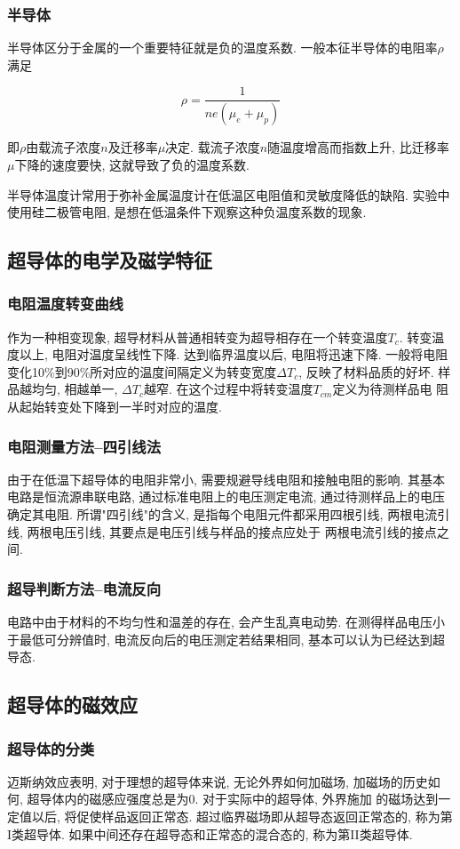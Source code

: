 \documentclass[12pt,a4paper]{article}
\newcommand{\be}[1]{
    \begin{equation}
        #1
    \end{equation}
}
\begin{document}
\subsubsection{半导体}
半导体区分于金属的一个重要特征就是负的温度系数. 一般本征半导体的电阻率$\rho$满足
\be{\rho=\frac{1}{n e (\mu_{e}+\mu_{p})}}
即$\rho$由载流子浓度$n$及迁移率$\mu$决定. 载流子浓度$n$随温度增高而指数上升, 比迁移率$\mu$下降的速度要快, 这就导致了负的温度系数. 

半导体温度计常用于弥补金属温度计在低温区电阻值和灵敏度降低的缺陷. 实验中使用硅二极管电阻, 是想在低温条件下观察这种负温度系数的现象. 

\subsection{超导体的电学及磁学特征}
\subsubsection{电阻温度转变曲线}
作为一种相变现象, 超导材料从普通相转变为超导相存在一个转变温度$T_c$. 转变温度以上, 电阻对温度呈线性下降. 达到临界温度以后, 电阻将迅速下降. 一般将电阻变化10\%到90\%所对应的温度间隔定义为转变宽度$\Delta T_c$, 
反映了材料品质的好坏. 样品越均匀, 相越单一, $\Delta T_c$越窄. 在这个过程中将转变温度$T_{cm}$定义为待测样品电
阻从起始转变处下降到一半时对应的温度. 
\subsubsection{电阻测量方法--四引线法}
由于在低温下超导体的电阻非常小, 需要规避导线电阻和接触电阻的影响. 其基本电路是恒流源串联电路, 通过标准电阻上的电压测定电流, 通过待测样品上的电压确定其电阻. 所谓"四引线"的含义, 是指每个电阻元件都采用四根引线, 两根电流引线, 两根电压引线, 其要点是电压引线与样品的接点应处于
两根电流引线的接点之间. 
\subsubsection{超导判断方法--电流反向}
电路中由于材料的不均匀性和温差的存在, 会产生乱真电动势. 在测得样品电压小于最低可分辨值时, 电流反向后的电压测定若结果相同, 基本可以认为已经达到超导态. 
\subsection{超导体的磁效应}
\subsubsection{超导体的分类}
迈斯纳效应表明, 对于理想的超导体来说, 无论外界如何加磁场, 加磁场的历史如何, 超导体内的磁感应强度总是为0. 对于实际中的超导体, 外界施加
的磁场达到一定值以后, 将促使样品返回正常态. 超过临界磁场即从超导态返回正常态的, 称为第I类超导体. 如果中间还存在超导态和正常态的混合态的, 称为第II类超导体. 
\end{document}
